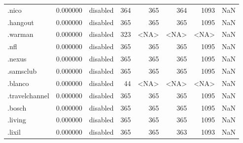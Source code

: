 \begin{tabular}{lrlrrrrl}
.nico                     &          0.000000 &        disabled &                         364 &                         365 &                         364 &                1093 &                  NaN \\
.hangout                  &          0.000000 &        disabled &                         365 &                         365 &                         365 &                1095 &                  NaN \\
.warman                   &          0.000000 &        disabled &                         323 &                        <NA> &                        <NA> &                <NA> &                  NaN \\
.nfl                      &          0.000000 &        disabled &                         365 &                         365 &                         365 &                1095 &                  NaN \\
.nexus                    &          0.000000 &        disabled &                         365 &                         365 &                         365 &                1095 &                  NaN \\
.samsclub                 &          0.000000 &        disabled &                         365 &                         365 &                         365 &                1095 &                  NaN \\
.blanco                   &          0.000000 &        disabled &                          44 &                        <NA> &                        <NA> &                <NA> &                  NaN \\
.travelchannel            &          0.000000 &        disabled &                         365 &                         365 &                         365 &                1095 &                  NaN \\
.bosch                    &          0.000000 &        disabled &                         365 &                         365 &                         365 &                1095 &                  NaN \\
.living                   &          0.000000 &        disabled &                         365 &                         365 &                         365 &                1095 &                  NaN \\
.lixil                    &          0.000000 &        disabled &                         365 &                         365 &                         363 &                1093 &                  NaN \\

\end{tabular}
